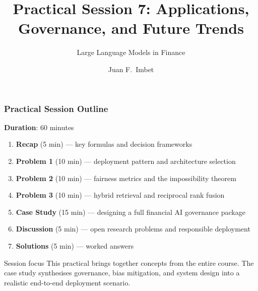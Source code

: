 \documentclass[9pt,t]{beamer}
\title{Practical Session 7: Applications, Governance, and Future Trends}
\subtitle{Large Language Models in Finance}
\author{Juan F.\ Imbet}
\institute{Paris Dauphine -- PSL University}
\date{}
\begin{document}
\begin{frame}
\frametitle{}
\titlepage
\end{frame}

\begin{frame}
\frametitle{Practical Session Outline}

\textbf{Duration}: 60 minutes

\begin{enumerate}
  \item \textbf{Recap} (5 min) — key formulas and decision frameworks
  \item \textbf{Problem 1} (10 min) — deployment pattern and architecture selection
  \item \textbf{Problem 2} (10 min) — fairness metrics and the impossibility theorem
  \item \textbf{Problem 3} (10 min) — hybrid retrieval and reciprocal rank fusion
  \item \textbf{Case Study} (15 min) — designing a full financial AI governance package
  \item \textbf{Discussion} (5 min) — open research problems and responsible deployment
  \item \textbf{Solutions} (5 min) — worked answers
\end{enumerate}

\medskip
\begin{block}{Session focus}
  This practical brings together concepts from the entire course.
  The case study synthesises governance, bias mitigation, and system design
  into a realistic end-to-end deployment scenario.
\end{block}
\end{frame}
\end{document}
